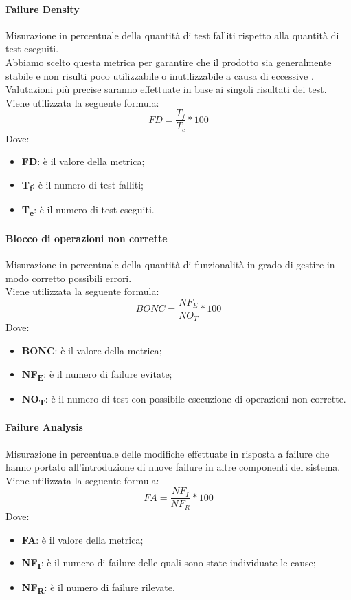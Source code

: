 \paragraph{Failure Density}\Spazio
Misurazione in percentuale della quantità di test falliti rispetto alla quantità di test eseguiti.
\\Abbiamo scelto questa metrica per garantire che il prodotto sia generalmente stabile e non risulti poco utilizzabile o inutilizzabile a causa di eccessive . Valutazioni più precise saranno effettuate in base ai singoli risultati dei test.\\
Viene utilizzata la seguente formula:
$$FD=\frac{T_f}{T_c}*100$$
Dove:
\begin{itemize}
	\item{\textbf{FD}: è il valore della metrica;}
	\item{\textbf{T\textsubscript{f}}: è il numero di test falliti;}
	\item{\textbf{T\textsubscript{e}}: è il numero di test eseguiti.}
\end{itemize}

\paragraph{Blocco di operazioni non corrette}\Spazio
Misurazione in percentuale della quantità di funzionalità in grado di gestire in modo corretto possibili errori.\\
Viene utilizzata la seguente formula:
$$BONC=\frac{NF_E}{NO_T}*100$$
Dove:
\begin{itemize}
	\item{\textbf{BONC}: è il valore della metrica;}
	\item{\textbf{NF\textsubscript{E}}: è il numero di failure evitate;}
	\item{\textbf{NO\textsubscript{T}}: è il numero di test con possibile esecuzione di operazioni non corrette.}
\end{itemize}
\paragraph{Failure Analysis}\Spazio
Misurazione in percentuale delle modifiche effettuate in risposta a failure che hanno portato all'introduzione di nuove failure in altre componenti del sistema. \\
Viene utilizzata la seguente formula:
$$FA=\frac{NF_I}{NF_R}*100$$
Dove:
\begin{itemize}
	\item{\textbf{FA}: è il valore della metrica;}
	\item{\textbf{NF\textsubscript{I}}: è il numero di failure delle quali sono state individuate le cause;}
	\item{\textbf{NF\textsubscript{R}}: è il numero di failure rilevate.}
\end{itemize}

